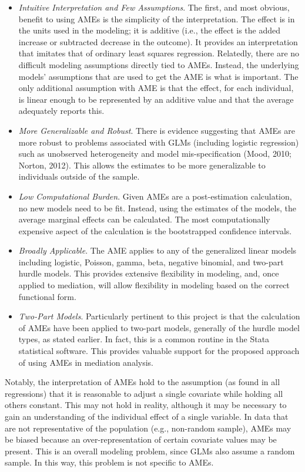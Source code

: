 \documentclass[]{DissertateUSU}
\begin{document}
\begin{itemize}
\item \emph{Intuitive Interpretation and Few Assumptions}. The first, and most obvious, benefit to using AMEs is the simplicity of the interpretation. The effect is in the units used in the modeling; it is additive (i.e., the effect is the added increase or subtracted decrease in the outcome). It provides an interpretation that imitates that of ordinary least squares regression. Relatedly, there are no difficult modeling assumptions directly tied to AMEs. Instead, the underlying models' assumptions that are used to get the AME is what is important. The only additional assumption with AME is that the effect, for each individual, is linear enough to be represented by an additive value and that the average adequately reports this.
\item \emph{More Generalizable and Robust}. There is evidence suggesting that AMEs are more robust to problems associated with GLMs (including logistic regression) such as unobserved heterogeneity and model mis-specification (Mood, 2010; Norton, 2012). This allows the estimates to be more generalizable to individuals outside of the sample.
\item \emph{Low Computational Burden}. Given AMEs are a post-estimation calculation, no new models need to be fit. Instead, using the estimates of the models, the average marginal effects can be calculated. The most computationally expensive aspect of the calculation is the bootstrapped confidence intervals. 
\item \emph{Broadly Applicable}. The AME applies to any of the generalized linear models including logistic, Poisson, gamma, beta, negative binomial, and two-part hurdle models. This provides extensive flexibility in modeling, and, once applied to mediation, will allow flexibility in modeling based on the correct functional form.
\item \emph{Two-Part Models}. Particularly pertinent to this project is that the calculation of AMEs have been applied to two-part models, generally of the hurdle model types, as stated earlier. In fact, this is a common routine in the Stata statistical software. This provides valuable support for the proposed approach of using AMEs in mediation analysis.
\end{itemize}

Notably, the interpretation of AMEs hold to the assumption (as found in
all regressions) that it is reasonable to adjust a single covariate
while holding all others constant. This may not hold in reality,
although it may be necessary to gain an understanding of the individual
effect of a single variable. In data that are not representative of the
population (e.g., non-random sample), AMEs may be biased because an
over-representation of certain covariate values may be present. This is
an overall modeling problem, since GLMs also assume a random sample. In
this way, this problem is not specific to AMEs.
\end{document}
